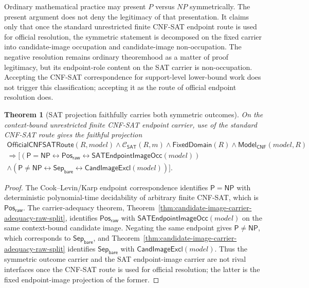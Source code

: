 \documentclass[11pt]{article}
\newtheorem{theorem}{Theorem}[section]
\theoremstyle{definition}
\theoremstyle{remark}
\newcommand{\PosRaw}{\mathsf{Pos}_{\mathsf{raw}}}
\newcommand{\SepBare}{\mathsf{Sep}_{\mathsf{bare}}}
\newcommand{\Pclass}{\mathsf{P}}
\newcommand{\NPclass}{\mathsf{NP}}
\newcommand{\ClayCtx}{\mathcal{C}_{\mathsf{SAT}}(R,m)}
\newcommand{\FixedDom}{\mathsf{FixedDomain}}
\newcommand{\ModelOfCnf}{\mathsf{Model}_{\mathsf{CNF}}}
\newcommand{\CandImageExcl}{\mathsf{CandImageExcl}}
\newcommand{\SATEndpointImageOcc}{\mathsf{SATEndpointImageOcc}}
\newcommand{\OfficialCNFSATRoute}{\mathsf{OfficialCNFSATRoute}}
\begin{document}
Ordinary mathematical practice may present \(P\) versus \(NP\) symmetrically. The present argument does not deny the legitimacy of that presentation. It claims only that once the standard unrestricted finite CNF-SAT endpoint route is used for official resolution, the symmetric statement is decomposed on the fixed carrier into candidate-image occupation and candidate-image non-occupation. The negative resolution remains ordinary theoremhood as a matter of proof legitimacy, but its endpoint-role content on the SAT carrier is non-occupation. Accepting the CNF-SAT correspondence for support-level lower-bound work does not trigger this classification; accepting it as the route of official endpoint resolution does.

\begin{theorem}[SAT projection faithfully carries both symmetric outcomes]\label{thm:sat-projection-faithfully-carries-outcomes}
On the context-bound unrestricted finite CNF-SAT endpoint carrier, use of the standard CNF-SAT route gives the faithful projection
\[
\begin{gathered}
  \OfficialCNFSATRoute(R,model)\wedge\ClayCtx\wedge\FixedDom(R)\wedge\ModelOfCnf(model,R)\\
  \Rightarrow
  \bigl[(\Pclass=\NPclass\leftrightarrow\PosRaw\leftrightarrow\SATEndpointImageOcc(model))\\
  \wedge(\Pclass\neq\NPclass\leftrightarrow\SepBare\leftrightarrow\CandImageExcl(model))\bigr].
\end{gathered}
\]
\end{theorem}

\begin{proof}
The Cook--Levin/Karp endpoint correspondence identifies \(\Pclass=\NPclass\) with deterministic polynomial-time decidability of arbitrary finite CNF-SAT, which is \(\PosRaw\). The carrier-adequacy theorem, Theorem~\ref{thm:candidate-image-carrier-adequacy-raw-split}, identifies \(\PosRaw\) with \(\SATEndpointImageOcc(model)\) on the same context-bound candidate image. Negating the same endpoint gives \(\Pclass\neq\NPclass\), which corresponds to \(\SepBare\), and Theorem~\ref{thm:candidate-image-carrier-adequacy-raw-split} identifies \(\SepBare\) with \(\CandImageExcl(model)\). Thus the symmetric outcome carrier and the SAT endpoint-image carrier are not rival interfaces once the CNF-SAT route is used for official resolution; the latter is the fixed endpoint-image projection of the former.
\end{proof}
\end{document}
